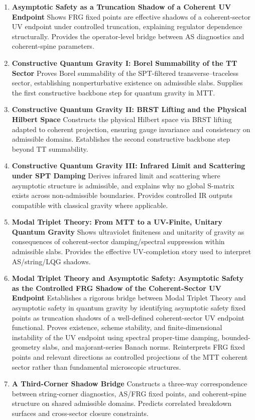 \documentclass[11pt]{article}
\begin{document}
\begin{enumerate}[leftmargin=*]
\item \textbf{Asymptotic Safety as a Truncation Shadow of a Coherent UV Endpoint} Shows FRG fixed points are effective shadows of a coherent-sector UV endpoint under controlled truncation, explaining regulator dependence structurally. Provides the operator-level bridge between AS diagnostics and coherent-spine parameters.
\item \textbf{Constructive Quantum Gravity I: Borel Summability of the TT Sector} Proves Borel summability of the SPT-filtered transverse–traceless sector, establishing nonperturbative existence on admissible slabs. Supplies the first constructive backbone step for quantum gravity in MTT.
\item \textbf{Constructive Quantum Gravity II: BRST Lifting and the Physical Hilbert Space} Constructs the physical Hilbert space via BRST lifting adapted to coherent projection, ensuring gauge invariance and consistency on admissible domains. Establishes the second constructive backbone step beyond TT summability.
\item \textbf{Constructive Quantum Gravity III: Infrared Limit and Scattering under SPT Damping} Derives infrared limit and scattering where asymptotic structure is admissible, and explains why no global S-matrix exists across non-admissible boundaries. Provides controlled IR outputs compatible with classical gravity where applicable.
\item \textbf{Modal Triplet Theory: From MTT to a UV-Finite, Unitary Quantum Gravity} Shows ultraviolet finiteness and unitarity of gravity as consequences of coherent-sector damping/spectral suppression within admissible slabs. Provides the effective UV-completion story used to interpret AS/string/LQG shadows.
\item \textbf{Modal Triplet Theory and Asymptotic Safety: Asymptotic Safety as the Controlled FRG Shadow of the Coherent-Sector UV Endpoint} 
Establishes a rigorous bridge between Modal Triplet Theory and asymptotic safety in quantum gravity by identifying asymptotic safety fixed points as truncation shadows of a well-defined coherent-sector UV endpoint functional. Proves existence, scheme stability, and finite-dimensional instability of the UV endpoint using spectral proper-time damping, bounded-geometry slabs, and majorant-series Banach norms. Reinterprets FRG fixed points and relevant directions as controlled projections of the MTT coherent sector rather than fundamental microscopic structures.
\item \textbf{A Third-Corner Shadow Bridge} Constructs a three-way correspondence between string-corner diagnostics, AS/FRG fixed points, and coherent-spine structure on shared admissible domains. Predicts correlated breakdown surfaces and cross-sector closure constraints.
\end{enumerate}
\end{document}
